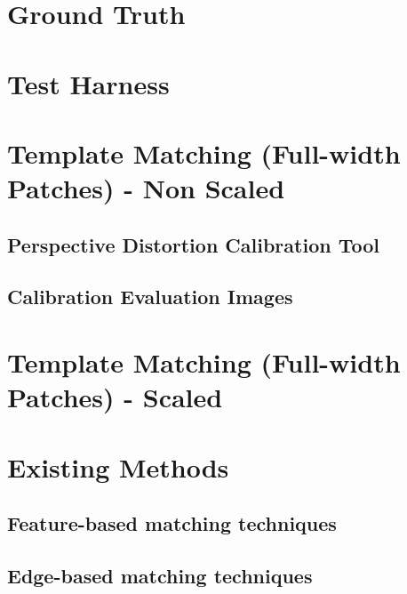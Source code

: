 \section{Ground Truth}

\section{Test Harness}

\section{Template Matching (Full-width Patches) - Non Scaled}

\subsection{Perspective Distortion Calibration Tool}

\subsection{Calibration Evaluation Images}

\section{Template Matching (Full-width Patches) - Scaled}

\section{Existing Methods}

\subsection{Feature-based matching techniques}

\subsection{Edge-based matching techniques}




